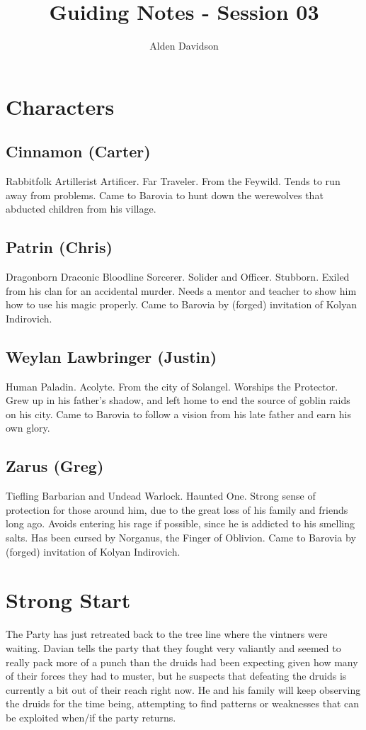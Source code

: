 \documentclass[a4paper,11pt]{article}
\title{Guiding Notes - Session 03}
\author{Alden Davidson}
\begin{document}
\maketitle
\tableofcontents

\pagebreak
\section{Characters}
\label{sec:Characters}
\subsection{Cinnamon (Carter)}
  Rabbitfolk Artillerist Artificer. Far Traveler. From the Feywild. Tends to run away from problems. Came to
  Barovia to hunt down the werewolves that abducted children from his village.
\subsection{Patrin (Chris)}
  Dragonborn Draconic Bloodline Sorcerer. Solider and Officer. Stubborn. Exiled from his clan for an accidental 
  murder. Needs a mentor and teacher to show him how to use his magic properly. Came to Barovia by (forged)
  invitation of Kolyan Indirovich.
\subsection{Weylan Lawbringer (Justin)}
  Human Paladin. Acolyte. From the city of Solangel. Worships the Protector. Grew up in his father's shadow, and 
  left home to end the source of goblin raids on his city. Came to Barovia to follow a vision from his late 
  father and earn his own glory.
\subsection{Zarus (Greg)}
  Tiefling Barbarian and Undead Warlock. Haunted One. Strong sense of protection for those around him, due to the
  great loss of his family and friends long ago. Avoids entering his rage if possible, since he is addicted to 
  his smelling salts. Has been cursed by Norganus, the Finger of Oblivion. Came to Barovia by (forged) 
  invitation of Kolyan Indirovich.


\pagebreak
\section{Strong Start}
\label{sec:StrongStart}
The Party has just retreated back to the tree line where the vintners were waiting. Davian tells the party that
they fought very valiantly and seemed to really pack more of a punch than the druids had been expecting given
how many of their forces they had to muster, but he suspects that defeating the druids is currently a bit out of 
their reach right now. He and his family will keep observing the druids for the time being, attempting to find
patterns or weaknesses that can be exploited when/if the party returns.
\end{document}
